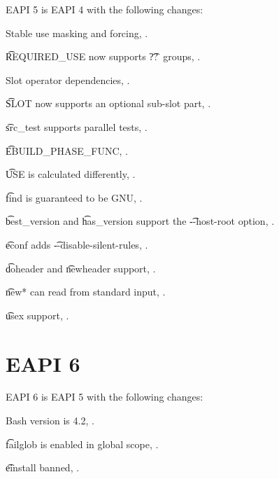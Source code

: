 EAPI 5 is EAPI 4 with the following changes:

\begin{compactitem}
\item Stable use masking and forcing, .
\item \t{REQUIRED\_USE} now supports \t{??}\ groups, .
\item Slot operator dependencies, .
\item \t{SLOT} now supports an optional sub-slot part, .
\item \t{src\_test} supports parallel tests, .
\item \t{EBUILD\_PHASE\_FUNC}, .
\item \t{USE} is calculated differently, .
\item \t{find} is guaranteed to be GNU, .
\item \t{best\_version} and \t{has\_version} support the \t{-{}-host-root} option,
    .
\item \t{econf} adds \t{-{}-disable-silent-rules}, .
\item \t{doheader} and \t{newheader} support, .
\item \t{new*} can read from standard input, .
\item \t{usex} support, .
\end{compactitem}

\section*{EAPI 6}

EAPI 6 is EAPI 5 with the following changes:

\begin{compactitem}
\item Bash version is 4.2, .
\item \t{failglob} is enabled in global scope, .
\item \t{einstall} banned, .
\end{compactitem}



